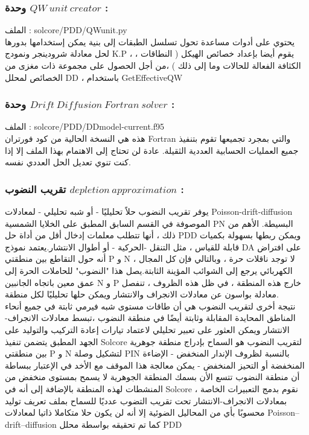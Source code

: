 \subsubsection{وحدة $ QW ~ unit ~creator $ :}
الملف : 
solcore/PDD/QWunit.py
\\
يحتوي على أدوات مساعدة تحول تسلسل الطبقات إلى بنية يمكن إستخدامها بدورها لحل معادلة شرودينجر ونمودج K.P ، يقوم أيضا بإعداد خصائص الهيكل ( النطاقات ، الكثافة الفعالة للحالات وما إلى ذلك ) ،من أجل الحصول على مجموعة ذات مغزى من الخصائص لمحلل DD ، باستخدام GetEffectiveQW
\subsubsection{وحدة  $  Drift ~Diffusion ~Fortran ~solver  $ :}
الملف : 
solcore/PDD/DDmodel-current.f95
\\
هذه هي النسخة الحالية من كود فورتران Fortran  والتي بمجرد تجميعها تقوم بتنفيذ جميع العمليات الحسابية العددية الثقيلة. عادة لن تحتاج إلى الاهتمام بهذا الملف إلا إذا كنت تنوي تعديل الحل العددي نفسه.
\subsubsection{تقريب النضوب $ depletion ~approximation $ :}
يوفر  تقريب  النضوب حلاً تحليليًا - أو شبه تحليلي - لمعادلات Poisson-drift-diffusion الموصوفة في القسم السابق المطبق على الخلايا الشمسية   PN البسيطة. الأهم من ذلك ، أنها تتطلب معلمات إدخال أقل من أداة حل PDD ويمكن ربطها بسهولة بكميات قابلة للقياس ، مثل التنقل -الحركية - أو أطوال الانتشار.يعتمد نموذج DA على افتراض أنه حول التقاطع بين منطقتي P و N ، لا توجد ناقلات حرة ، وبالتالي فإن كل المجال الكهربائي يرجع إلى الشوائب  المؤينة الثابتة.يصل هذا "النضوب" للحاملات الحرة إلى عمق معين باتجاه الجانبين N و P  خارج هذه المنطقة ، في ظل هذه الظروف ، تنفصل معادلة بواسون عن معادلات الانجراف والانتشار ويمكن حلها تحليليًا لكل منطقة.\\
نتيجة أخرى لتقريب النضوب هي أن طاقات مستوى شبه فيرمي ثابتة في جميع أنحاء المناطق المحايدة المقابلة وثابتة أيضًا في منطقة النضوب ،تبسط معادلات الانجراف-الانتشار ويمكن العثور على تعبير تحليلي لاعتماد تيارات إعادة التركيب والتوليد على الجهد المطبق
يتضمن تنفيذ Solcore لتقريب النضوب  هو السماح بإدراج  منطقة جوهرية  بين منطقتي P و N لتشكيل وصلة  PIN بالنسبة لظروف الإندار المنخفض - الإضاءة المنخفضة أو التحيز المنخفض - يمكن معالجة هذا الموقف مع الأخد في الإعتبار ببساطة أن منطقة النضوب تتسع الأن بسمك المنطقة الجوهرية لا يسمح بمستوى منخفض من المنشطات لهذه المنطقة بالإضافة إلى أنه في Solcore ، نقوم بدمج التعبيرات الخاصة بمعادلات الانجراف-الانتشار تحت تقريب التضوب عدديًا للسماح بملف تعريف توليد   محسوبًا بأي من المحاليل  الضوئية إلا أنه لن يكون حلا متكاملا ذاتيا لمعادلات Poisson–drift–diffusion كما تم تحقيقه بواسطة محلل    
PDD
